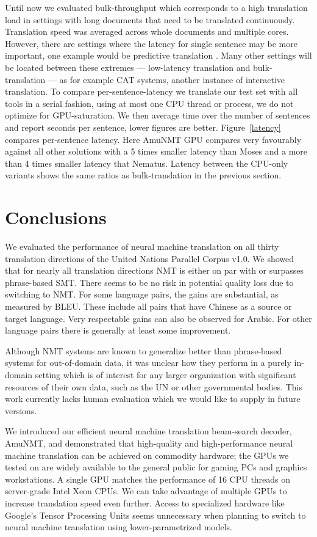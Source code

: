 \documentclass[11pt]{article}
\begin{document}
Until now we evaluated bulk-throughput which corresponds to a high translation load in settings with long documents that need to be translated continuously. Translation speed was averaged across whole documents and multiple cores. However, there are settings where the latency for single sentence may be more important, one example would be predictive translation \cite{Knowles}. Many other settings will be located between these extremes --- low-latency translation and bulk-translation --- as for example CAT systems, another instance of interactive translation. 
To compare per-sentence-latency we translate our test set with all tools in a serial fashion, using at most one CPU thread or process, we do not optimize for GPU-saturation. We then average time over the number of sentences and report seconds per sentence, lower figures are better. Figure~\ref{latency} compares per-sentence latency. Here AmuNMT GPU compares very favourably against all other solutions with a 5 times smaller latency than Moses and a more than 4 times smaller latency that Nematus. Latency between the CPU-only variants shows the same ratios as bulk-translation in the previous section.

\section{Conclusions}

We evaluated the performance of neural machine translation on all thirty translation directions of the United Nations Parallel Corpus v1.0. We showed that for nearly all translation directions NMT is either on par with or surpasses phrase-based SMT. There seems to be no risk in potential quality loss due to switching to NMT. For some language pairs, the gains are substantial, as measured by BLEU. These include all pairs that have Chinese as a source or target language. Very respectable gains can also be observed for Arabic. For other language pairs there is generally at least some improvement. 

Although NMT systems are known to generalize better than phrase-based systems for out-of-domain data, it was unclear how they perform in a purely in-domain setting which is of interest for any larger organization with significant resources of their own data, such as the UN or other governmental bodies. This work currently lacks human evaluation which we would like to supply in future versions. 

We introduced our efficient neural machine translation beam-search decoder, AmuNMT, and demonstrated that high-quality and high-performance neural machine translation can be achieved on commodity hardware; the GPUs we tested on are widely available to the general public for gaming PCs and graphics workstations. A single GPU matches the performance of 16 CPU threads on server-grade Intel Xeon CPUs. We can take advantage of multiple GPUs to increase translation speed even further. Access to specialized hardware like Google's Tensor Processing Units seems unnecessary when planning to switch to neural machine translation using lower-parametrized models. 
\end{document}
